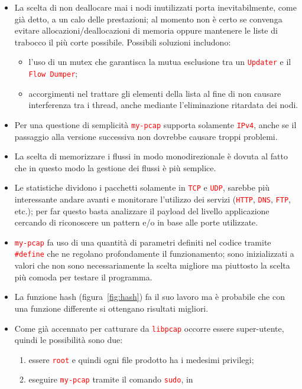 \documentclass[a4paper,11pt]{article}
\newcommand\code[1]{\textcolor{red}{\texttt{#1}}}
\begin{document}
\begin{itemize}
\item La scelta di non deallocare mai i nodi inutilizzati porta
  inevitabilmente, come già detto, a un calo delle prestazioni; al
  momento non è certo se convenga evitare allocazioni/deallocazioni di
  memoria oppure mantenere le liste di trabocco il più corte
  possibile. Possibili soluzioni includono:
  \begin{itemize}
    \item l'uso di un mutex che garantisca la mutua esclusione tra un
      \code{Updater} e il \code{Flow~Dumper};
    \item accorgimenti nel trattare gli elementi della lista al fine
      di non causare interferenza tra i thread, anche mediante
      l'eliminazione ritardata dei nodi.
  \end{itemize}
\item Per una questione di semplicità \code{my-pcap} supporta
  solamente \code{IPv4}, anche se il passaggio alla versione
  successiva non dovrebbe causare troppi problemi.
\item La scelta di memorizzare i flussi in modo monodirezionale è
  dovuta al fatto che in questo modo la gestione dei flussi è più
  semplice.
\item Le statistiche dividono i pacchetti solamente in \code{TCP} e
  \code{UDP}, sarebbe più interessante andare avanti e monitorare
  l'utilizzo dei servizi (\code{HTTP}, \code{DNS}, \code{FTP}, etc.);
  per far questo basta analizzare il payload del livello applicazione
  cercando di riconoscere un pattern e/o in base alle porte
  utilizzate.
\item \code{my-pcap} fa uso di una quantità di parametri definiti nel
  codice tramite \code{\#define} che ne regolano profondamente il
  funzionamento; sono inizializzati a valori che non sono
  necessariamente la scelta migliore ma piuttosto la scelta più comoda
  per testare il programma.
\item La funzione hash (figura~\ref{fig:hash}) fa il suo lavoro ma è
  probabile che con una funzione differente si ottengano risultati
  migliori.
\item Come già accennato per catturare da \code{libpcap} occorre
  essere super-utente, quindi le possibilità sono due:
  \begin{enumerate}
  \item essere \code{root} e quindi ogni file prodotto ha i medesimi
    privilegi;
  \item eseguire \code{my-pcap} tramite il comando \code{sudo}, in

\end{enumerate}
\end{itemize}
\end{document}
